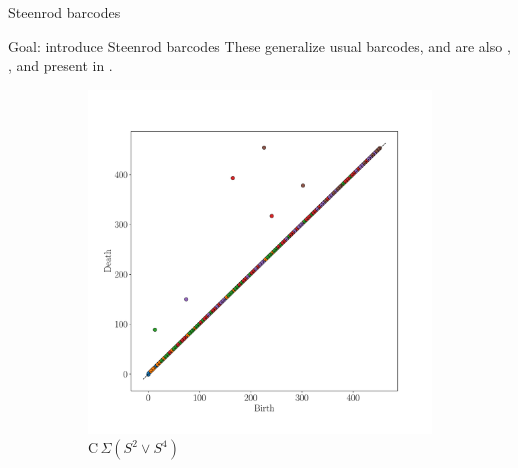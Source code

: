 
\begin{frame}
	\centering
	\vspace*{2.6cm}
	\Huge {}
	\vskip 20pt
	\Large Steenrod barcodes
\end{frame}

\begin{frame}{Goal: introduce Steenrod barcodes}
	\pause
	These generalize usual barcodes, and are also
	\pause
	,
	\pause
	,
	\pause
	and present in .

	\pause\medskip
	\vskip-15pt
	\begin{figure}
		\centering
		\begin{subfigure}[b]{0.49\textwidth}
			\centering
			\includegraphics[width=\textwidth]{aux/s2_s4.pdf}
			\caption{$\mathrm C\,\Sigma(S^2 \vee S^4)$}
			\label{f:s2_s4}
		\end{subfigure}
		\pause
		\begin{subfigure}[b]{0.49\textwidth}
			\centering

\end{subfigure}
\end{figure}
\end{frame}

